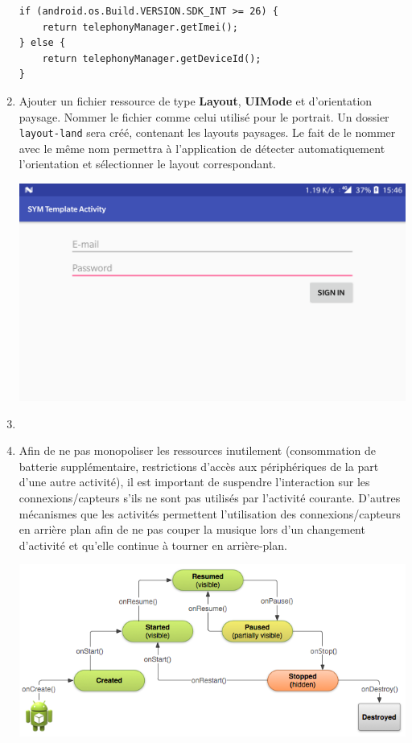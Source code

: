 \documentclass[a4paper]{article}
\begin{document}
\begin{enumerate}
    \begin{lstlisting}
if (android.os.Build.VERSION.SDK_INT >= 26) {
    return telephonyManager.getImei();
} else {
    return telephonyManager.getDeviceId();
}
    \end{lstlisting}
    
    \item Ajouter un fichier ressource de type \textbf{Layout}, \textbf{UIMode} et d'orientation paysage. Nommer le fichier comme celui utilisé pour le portrait. Un dossier \texttt{layout-land} sera créé, contenant les layouts paysages. Le fait de le nommer avec le même nom permettra à l'application de détecter automatiquement l'orientation et sélectionner le layout correspondant.
    
    \begin{minipage}{\linewidth}
    	\centering
    	\includegraphics[width=0.6\linewidth]{images/landscape_screen.png}
    \end{minipage}
    
    \item 
    
    \item Afin de ne pas monopoliser les ressources inutilement (consommation de batterie supplémentaire, restrictions d'accès aux périphériques de la part d'une autre activité), il est important de suspendre l'interaction sur les connexions/capteurs s'ils ne sont pas utilisés par l'activité courante. D'autres mécanismes que les activités permettent l'utilisation des connexions/capteurs en arrière plan afin de ne pas couper la musique lors d'un changement d'activité et qu'elle continue à tourner en arrière-plan.
    
    \begin{minipage}{\linewidth}
    	\centering
    	\includegraphics[width=\linewidth]{images/app_lifecycle.png}
    \end{minipage}
    

\end{enumerate}
\end{document}
